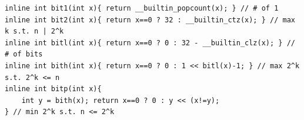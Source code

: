 \begin{verbatim}
inline int bit1(int x){ return __builtin_popcount(x); } // # of 1
inline int bit2(int x){ return x==0 ? 32 : __builtin_ctz(x); } // max k s.t. n | 2^k
inline int bitl(int x){ return x==0 ? 0 : 32 - __builtin_clz(x); } // # of bits
inline int bith(int x){ return x==0 ? 0 : 1 << bitl(x)-1; } // max 2^k s.t. 2^k <= n
inline int bitp(int x){
	int y = bith(x); return x==0 ? 0 : y << (x!=y);
} // min 2^k s.t. n <= 2^k
\end{verbatim}